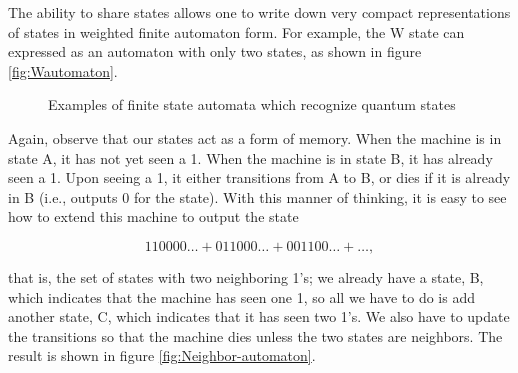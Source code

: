 \documentclass{amsbook}
\theoremstyle{plain}
\theoremstyle{definition}
\theoremstyle{remark}
\begin{document}
The ability to share states allows one to write down very compact
 representations of states in weighted finite automaton form.  For example, the W state can expressed as an automaton with only two states, as shown in figure \ref{fig:Wautomaton}.

\begin{figure}
\caption{Examples of finite state automata which recognize quantum states}
\end{figure}

Again, observe that our states act as a form of memory.  When the machine is in state A, it has not yet seen a 1.  When the machine is in state B, it has already seen a 1.  Upon seeing a 1, it either transitions from A to B, or dies if it is already in B (i.e., outputs 0 for the state).  With this manner of thinking, it is easy to see how to extend this machine to output the state

$$110000\dots + 011000\dots + 001100\dots + \dots,$$

\noindent that is, the set of states with two neighboring 1's;  we already have a state, B, which indicates that the machine has seen one 1, so all we have to do is add another state, C, which indicates that it has seen two 1's.  We also have to update the transitions so that the machine dies unless the two states are neighbors.  The result is shown in figure \ref{fig:Neighbor-automaton}.
\end{document}
